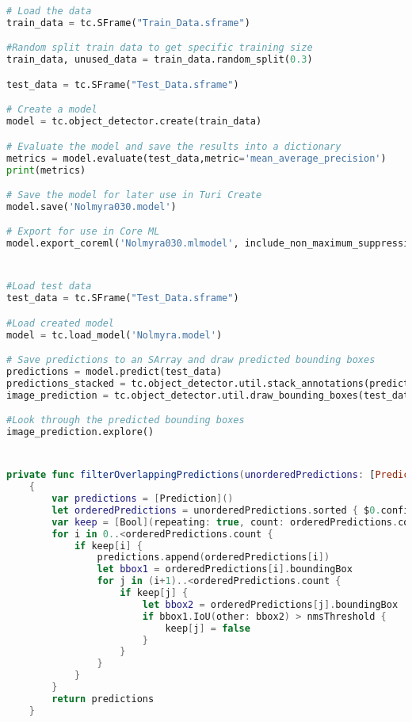 \begin{appendices}
\begin{lstlisting}[language=python]
# Load the data
train_data = tc.SFrame("Train_Data.sframe")

#Random split train data to get specific training size
train_data, unused_data = train_data.random_split(0.3)

test_data = tc.SFrame("Test_Data.sframe")

# Create a model
model = tc.object_detector.create(train_data)

# Evaluate the model and save the results into a dictionary
metrics = model.evaluate(test_data,metric='mean_average_precision')
print(metrics)

# Save the model for later use in Turi Create
model.save('Nolmyra030.model')

# Export for use in Core ML
model.export_coreml('Nolmyra030.mlmodel', include_non_maximum_suppression=False)
\end{lstlisting}

\section{}
\begin{lstlisting}[language=python]
#Load test data
test_data = tc.SFrame("Test_Data.sframe")

#Load created model
model = tc.load_model('Nolmyra.model')

# Save predictions to an SArray and draw predicted bounding boxes
predictions = model.predict(test_data)
predictions_stacked = tc.object_detector.util.stack_annotations(predictions)
image_prediction = tc.object_detector.util.draw_bounding_boxes(test_data['image'], predictions)

#Look through the predicted bounding boxes
image_prediction.explore()
\end{lstlisting}

\section{}
\begin{lstlisting}[language=swift]
    private func filterOverlappingPredictions(unorderedPredictions: [Prediction], nmsThreshold: Float) -> [Prediction]
    {
        var predictions = [Prediction]()
        let orderedPredictions = unorderedPredictions.sorted { $0.confidence > $1.confidence }
        var keep = [Bool](repeating: true, count: orderedPredictions.count)
        for i in 0..<orderedPredictions.count {
            if keep[i] {
                predictions.append(orderedPredictions[i])
                let bbox1 = orderedPredictions[i].boundingBox
                for j in (i+1)..<orderedPredictions.count {
                    if keep[j] {
                        let bbox2 = orderedPredictions[j].boundingBox
                        if bbox1.IoU(other: bbox2) > nmsThreshold {
                            keep[j] = false
                        }
                    }
                }
            }
        }
        return predictions
    }
    

\end{lstlisting}
\end{appendices}
